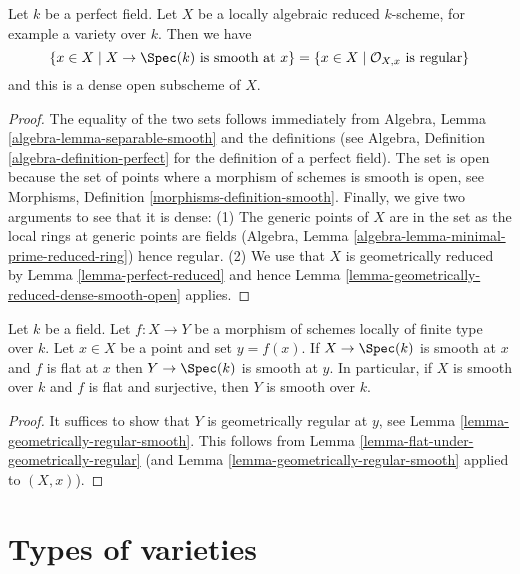 \begin{lemma}
\label{lemma-dense-smooth-open-variety-over-perfect-field}
Let $k$ be a perfect field. Let $X$ be a locally algebraic
reduced $k$-scheme, for example a variety over $k$. Then we have
$$
\{x \in X \mid X \to \Spec(k)\text{ is smooth at }x\} =
\{x \in X \mid \mathcal{O}_{X, x}\text{ is regular}\}
$$
and this is a dense open subscheme of $X$.
\end{lemma}

\begin{proof}
The equality of the two sets follows immediately from
Algebra, Lemma \ref{algebra-lemma-separable-smooth} and the definitions
(see Algebra, Definition \ref{algebra-definition-perfect} for the definition
of a perfect field). The set is open because the set of points where
a morphism of schemes is smooth is open, see
Morphisms, Definition \ref{morphisms-definition-smooth}.
Finally, we give two arguments to see that it is dense:
(1) The generic points of $X$ are in the set as the local rings at
generic points are fields (Algebra, Lemma
\ref{algebra-lemma-minimal-prime-reduced-ring}) hence regular.
(2) We use that $X$ is geometrically reduced by
Lemma \ref{lemma-perfect-reduced} and hence
Lemma \ref{lemma-geometrically-reduced-dense-smooth-open} applies.
\end{proof}

\begin{lemma}
\label{lemma-flat-under-smooth}
Let $k$ be a field. Let $f : X \to Y$ be a morphism of schemes locally
of finite type over $k$. Let $x \in X$ be a point and set $y = f(x)$.
If $X \to \Spec(k)$ is smooth at $x$ and $f$ is flat at $x$
then $Y \to \Spec(k)$ is smooth at $y$. In particular, if $X$ is
smooth over $k$ and $f$ is flat and surjective, then $Y$ is smooth over $k$.
\end{lemma}

\begin{proof}
It suffices to show that $Y$ is geometrically regular at $y$, see
Lemma \ref{lemma-geometrically-regular-smooth}.
This follows from
Lemma \ref{lemma-flat-under-geometrically-regular}
(and
Lemma \ref{lemma-geometrically-regular-smooth}
applied to $(X, x)$).
\end{proof}




\section{Types of varieties}
\label{section-types}

